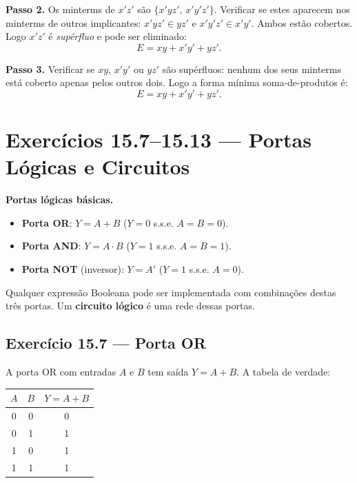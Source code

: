 \documentclass[12pt,a4paper]{article}
\newcommand{\keyword}[1]{\textbf{\textcolor{azul}{#1}}}
\newcommand{\passo}[1]{\medskip\noindent\textcolor{verde}{\textbf{Passo #1.}}\;}
\begin{document}
\passo{2} Os minterms de $x'z'$ são $\{x'yz',\, x'y'z'\}$. Verificar se estes aparecem
nos minterms de outros implicantes: $x'yz' \in yz'$ e $x'y'z' \in x'y'$. Ambos estão
cobertos. Logo $x'z'$ é \emph{supérfluo} e pode ser eliminado:
\[
  E = xy + x'y' + yz'.
\]

\passo{3} Verificar se $xy$, $x'y'$ ou $yz'$ são supérfluos: nenhum dos seus minterms
está coberto apenas pelos outros dois. Logo a forma mínima soma-de-produtos é:
\[
  \boxed{E = xy + x'y' + yz'.}
\]

\section*{Exercícios 15.7--15.13 — Portas Lógicas e Circuitos}

\begin{teoriacaixa}
\textbf{Portas lógicas básicas.}
\begin{itemize}[noitemsep]
  \item \textbf{Porta OR}: $Y = A + B$ ($Y = 0$ s.s.e. $A = B = 0$).
  \item \textbf{Porta AND}: $Y = A \cdot B$ ($Y = 1$ s.s.e. $A = B = 1$).
  \item \textbf{Porta NOT} (inversor): $Y = A'$ ($Y = 1$ s.s.e. $A = 0$).
\end{itemize}
Qualquer expressão Booleana pode ser implementada com combinações destas três portas.
Um \keyword{circuito lógico} é uma rede dessas portas.
\end{teoriacaixa}

\subsection*{Exercício 15.7 — Porta OR}

A porta OR com entradas $A$ e $B$ tem saída $Y = A + B$. A tabela de verdade:

\begin{center}
\begin{tabular}{cc|c}
  \toprule
  $A$ & $B$ & $Y = A+B$\\
  \midrule
  0 & 0 & 0\\
  0 & 1 & 1\\
  1 & 0 & 1\\
  1 & 1 & 1\\
  \bottomrule
\end{tabular}
\end{center}
\end{document}
